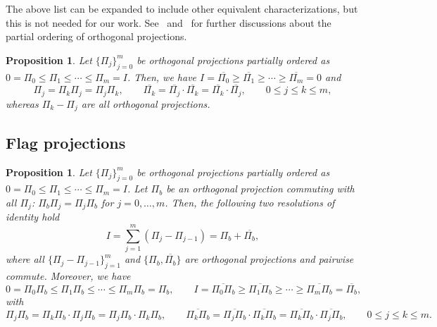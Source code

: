 \documentclass[letterpaper,onecolumn,11pt,accepted=2026-02-14]{quantumarticle}
\newtheorem{proposition}[lemma]{Proposition}
\theoremstyle{remark}
\theoremstyle{plain}
\begin{document}
The above list can be expanded to include other equivalent characterizations, but this is not needed for our work.
See~\cite[Section 2.5]{kadison1983fundamentals} and~\cite[Section 9.6]{kreyszig1991introductory} for further discussions about the partial ordering of orthogonal projections.

\begin{proposition}
Let $\{\Pi_j\}_{j=0}^m$ be orthogonal projections partially ordered as  $0=\Pi_0\leq\Pi_1\leq\cdots\leq\Pi_m=I$. Then, we have $I=\overline{\Pi_0}\geq\overline{\Pi_1}\geq\cdots\geq\overline{\Pi_m}=0$ and
\begin{equation}
    \Pi_j=\Pi_k\Pi_j=\Pi_j\Pi_k,\qquad 
    \overline{\Pi_k}=\overline{\Pi_j}\cdot\overline{\Pi_k}=\overline{\Pi_k}\cdot\overline{\Pi_j},\qquad
    0\leq j\leq k\leq m,
\end{equation}
whereas $\Pi_k-\Pi_j$ are all orthogonal projections.
\end{proposition}

\subsection{Flag projections}
\label{append:axiom_flag}

\begin{proposition}
Let $\{\Pi_j\}_{j=0}^m$ be orthogonal projections partially ordered as  $0=\Pi_0\leq\Pi_1\leq\cdots\leq\Pi_m=I$. Let $\Pi_b$ be an orthogonal projection commuting with all $\Pi_j$: $\Pi_b\Pi_j=\Pi_j\Pi_b$ for $j=0,\ldots, m$. Then, the following two resolutions of identity hold
\begin{equation}
    I=\sum_{j=1}^{m}\left(\Pi_j-\Pi_{j-1}\right)
    =\Pi_b+\overline{\Pi_b},
\end{equation}
where all $\{\Pi_j-\Pi_{j-1}\}_{j=1}^m$ and $\{\Pi_b,\overline{\Pi_b}\}$ are orthogonal projections and pairwise commute.
Moreover, we have
\begin{equation}
    0=\Pi_0\Pi_b\leq\Pi_1\Pi_b\leq\cdots\leq\Pi_m\Pi_b=\Pi_b,\qquad
    I=\overline{\Pi_0\Pi_b}\geq\overline{\Pi_1\Pi_b}\geq\cdots\geq\overline{\Pi_m\Pi_b}=\overline{\Pi_b},
\end{equation}
with
\begin{equation}
    \Pi_j\Pi_b=\Pi_k\Pi_b\cdot\Pi_j\Pi_b=\Pi_j\Pi_b\cdot\Pi_k\Pi_b,\qquad
    \overline{\Pi_k\Pi_b}=\overline{\Pi_j\Pi_b}\cdot\overline{\Pi_k\Pi_b}=\overline{\Pi_k\Pi_b}\cdot\overline{\Pi_j\Pi_b},\qquad
    0\leq j\leq k\leq m.
\end{equation}
\end{proposition}
\end{document}
